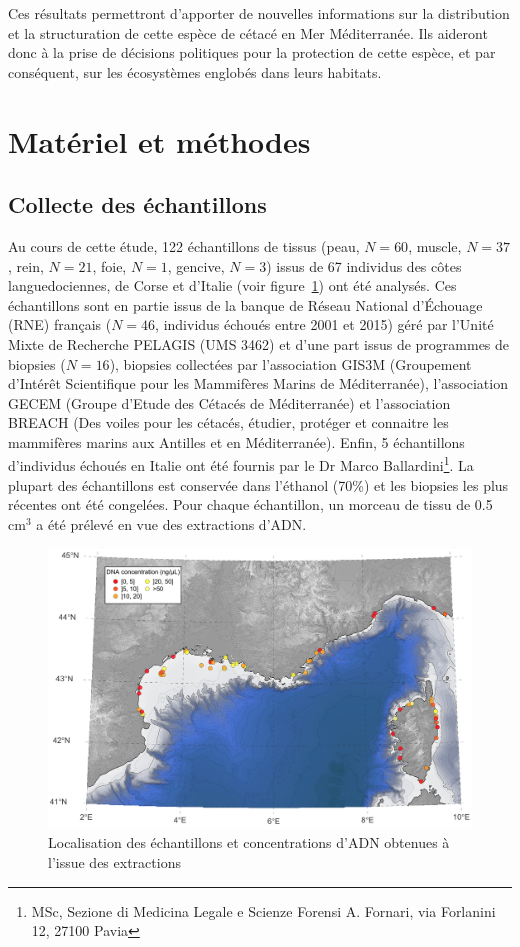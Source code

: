 \documentclass[a4paper,12pt,twoside]{article}\usepackage[]{graphicx}\usepackage[]{color}
\begin{document}
\begin {bibunit} [newbst]
Ces résultats permettront d'apporter de nouvelles informations sur la distribution et la structuration de cette espèce de cétacé en Mer Méditerranée. Ils aideront donc à la prise de décisions politiques pour la protection de cette espèce, et par conséquent, sur les écosystèmes englobés dans leurs habitats.


\section{Matériel et méthodes} 

\subsection{Collecte des échantillons} 
Au cours de cette étude, 122 échantillons de tissus (peau, $N= 60$, muscle, $N= 37$, rein, $N= 21$, foie, $N= 1$, gencive, $N= 3$) issus de 67 individus des côtes languedociennes, de Corse et d'Italie (voir figure~\ref{fig:concentration}) ont été analysés. Ces échantillons sont en partie issus de la banque de Réseau National d'Échouage (RNE) français ($N= 46$, individus échoués entre 2001 et 2015) géré par l'Unité Mixte de Recherche PELAGIS (UMS 3462) et d'une part issus de programmes de biopsies ($N= 16$), biopsies collectées par l'association GIS3M (Groupement d'Intérêt Scientifique pour les Mammifères Marins de Méditerranée), l'association GECEM (Groupe d'Etude des Cétacés de Méditerranée) et l'association BREACH (Des voiles pour les cétacés, étudier, protéger et connaitre les mammifères marins aux Antilles et en Méditerranée). Enfin, 5 échantillons d'individus échoués en Italie ont été fournis par le Dr Marco Ballardini\footnote{MSc, Sezione di Medicina Legale e Scienze Forensi A. Fornari, via Forlanini 12, 27100 Pavia}. La plupart des échantillons est conservée dans l'éthanol (70\%) et les biopsies les plus récentes ont été congelées. Pour chaque échantillon, un morceau de tissu de 0.5 cm$^3$ a été prélevé en vue des extractions d'ADN.

\begin{figure}[htbp]
	\centering
		\includegraphics[width=\textwidth]{concentrations.png}
	\caption{Localisation des échantillons et concentrations d'ADN obtenues à l'issue des extractions}
	\label{fig:concentration}
\end{figure}



\end{bibunit}
\end{document}

